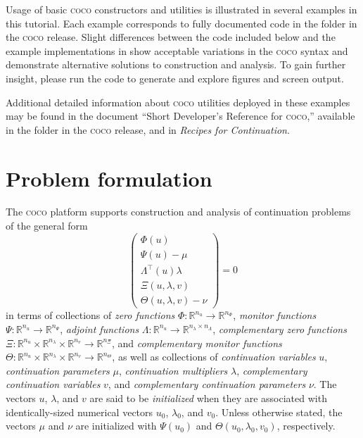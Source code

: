 Usage of basic \textsc{coco} constructors and utilities is illustrated in several examples in this tutorial. Each example corresponds to fully documented code in the  folder in the \textsc{coco} release. Slight differences between the code included below and the example implementations in  show acceptable variations in the \textsc{coco} syntax and demonstrate alternative solutions to construction and analysis. To gain further insight, please run the code to generate and explore figures and screen output.

Additional detailed information about \textsc{coco} utilities deployed in these examples may be found in the document ``Short Developer's Reference for \textsc{coco},'' available in the  folder in the \textsc{coco} release, and in \emph{Recipes for Continuation}.

\section{Problem formulation}
\label{chap: core}

The \textsc{coco} platform supports construction and analysis of continuation problems of the general form
\begin{equation}
\left(\begin{array}{c}\Phi(u)\\\Psi(u)-\mu\\\Lambda^\top(u)\lambda\\\Xi(u,\lambda,v)\\\Theta(u,\lambda,v)-\nu\end{array}\right)=0
\end{equation}
in terms of collections of \emph{zero functions} $\Phi:\mathbb{R}^{n_u}\rightarrow\mathbb{R}^{n_\Phi}$, \emph{monitor functions} $\Psi:\mathbb{R}^{n_u}\rightarrow\mathbb{R}^{n_\Psi}$, \emph{adjoint functions} $\Lambda:\mathbb{R}^{n_u}\rightarrow\mathbb{R}^{n_\lambda\times n_\Lambda}$, \emph{complementary zero functions} $\Xi:\mathbb{R}^{n_u}\times\mathbb{R}^{n_\lambda}\times\mathbb{R}^{n_v}\rightarrow\mathbb{R}^{n_\Xi}$, and \emph{complementary monitor functions} $\Theta:\mathbb{R}^{n_u}\times\mathbb{R}^{n_\lambda}\times\mathbb{R}^{n_v}\rightarrow\mathbb{R}^{n_\Theta}$, as well as collections of \emph{continuation variables} $u$, \emph{continuation parameters} $\mu$, \emph{continuation multipliers} $\lambda$, \emph{complementary continuation variables} $v$, and \emph{complementary continuation parameters} $\nu$. The vectors $u$, $\lambda$, and $v$ are said to be \emph{initialized} when they are associated with identically-sized numerical vectors $u_0$, $\lambda_0$, and $v_0$. Unless otherwise stated, the vectors $\mu$ and $\nu$ are initialized with $\Psi(u_0)$ and $\Theta(u_0,\lambda_0,v_0)$, respectively.

